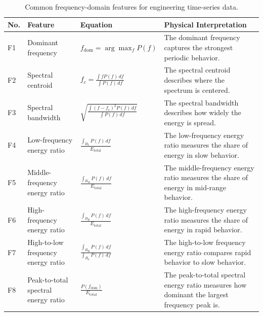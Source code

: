 \documentclass[12pt,letter]{article}
\begin{document}
\begin{table}[H]
	\centering
	\caption{Common frequency-domain features for engineering time-series data.}
	\label{tab:frequency_domain_features}
	\begin{tabular}{p{} p{} p{} p{}}
		\hline
		\textbf{No.} & \textbf{Feature} & \textbf{Equation} & \textbf{Physical Interpretation} \\
		\hline
		F1 & Dominant frequency 
		& \(\displaystyle f_{\mathrm{dom}}=\arg\max_f P(f)\) 
		& The dominant frequency captures the strongest periodic behavior. \\
		
		F2 & Spectral centroid 
		& \(\displaystyle f_c=\frac{\int fP(f)\,df}{\int P(f)\,df}\) 
		& The spectral centroid describes where the spectrum is centered. \\
		
		F3 & Spectral bandwidth 
		& \(\displaystyle \sqrt{\frac{\int (f-f_c)^2P(f)\,df}{\int P(f)\,df}}\) 
		& The spectral bandwidth describes how widely the energy is spread. \\
		
		F4 & Low-frequency energy ratio 
		& \(\displaystyle \frac{\int_{B_\text{L}}P(f)\,df}{E_{\mathrm{total}}}\) 
		& The low-frequency energy ratio measures the share of energy in slow behavior. \\
		
		F5 & Middle-frequency energy ratio 
		& \(\displaystyle \frac{\int_{B_\text{M}}P(f)\,df}{E_{\mathrm{total}}}\) 
		& The middle-frequency energy ratio measures the share of energy in mid-range behavior. \\
		
		F6 & High-frequency energy ratio 
		& \(\displaystyle \frac{\int_{B_\text{H}}P(f)\,df}{E_{\mathrm{total}}}\) 
		& The high-frequency energy ratio measures the share of energy in rapid behavior. \\
		
		F7 & High-to-low frequency energy ratio 
		& \(\displaystyle \frac{\int_{B_\text{H}}P(f)\,df}{\int_{B_\text{L}}P(f)\,df}\) 
		& The high-to-low frequency energy ratio compares rapid behavior to slow behavior. \\
		
		F8 & Peak-to-total spectral energy ratio 
		& \(\displaystyle \frac{P(f_{\mathrm{dom}})}{E_{\mathrm{total}}}\) 
		& The peak-to-total spectral energy ratio measures how dominant the largest frequency peak is. \\
		\hline
	\end{tabular}
\end{table}
\end{document}
